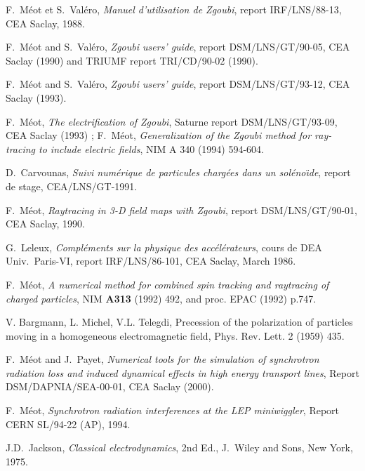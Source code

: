 \begin{thebibliography}{99}  %

 F.~M\'eot et S.~Val\'ero, \textsl{Manuel
d'utilisation de  Zgoubi}, report IRF/LNS/88-13, CEA Saclay, 1988.  

 F.~M\'eot and S.~Val\'ero, \textsl{Zgoubi users' guide}, 
report DSM/LNS/GT/90-05, CEA Saclay (1990) and TRIUMF report TRI/CD/90-02 (1990). 

 F.~M\'eot and S.~Val\'ero, \textsl{Zgoubi users' guide}, 
report DSM/LNS/GT/93-12, CEA Saclay (1993). 

 F.~M\'eot, \textsl{The electrification of Zgoubi}, 
Saturne report DSM/LNS/GT/93-09, CEA Saclay (1993) ; F.~M\'eot, \textsl{
Generalization of the Zgoubi method for ray-tracing to include electric 
fields}, NIM A 340 (1994) 594-604. 

 D.~Carvounas, \textsl{Suivi num\'erique de particules charg\'ees 
dans un sol\'eno\"\i de}, report de stage, CEA/LNS/GT-1991. 

 F.~M\'eot, \textsl{Raytracing in 3-D field maps with Zgoubi}, 
report  DSM/LNS/GT/90-01, CEA Saclay, 1990.

 G.~Leleux, \textsl{Compl\'ements sur la physique des acc\'el\'erateurs}, 
cours de DEA Univ.~Paris-VI,  report  IRF/LNS/86-101, CEA Saclay, March 1986. 

 F.~M\'eot, \textsl{A numerical method for combined spin tracking and 
raytracing of charged particles}, 
NIM \textbf{A313} (1992) 492, and proc. EPAC (1992) p.747. 

 V. Bargmann, L. Michel, V.L. Telegdi,
Precession of the polarization of particles moving in a homogeneous electromagnetic field, 
Phys. Rev. Lett. 2 (1959) 435.

 F.~M\'eot and J.~Payet, 
\textsl{Numerical tools for the simulation of synchrotron radiation  
loss and induced dynamical effects in high energy transport lines},  
Report DSM/DAPNIA/SEA-00-01, CEA Saclay (2000). 

 F.~M\'eot, \textsl{Synchrotron radiation interferences at the LEP miniwiggler}, 
Report CERN SL/94-22 (AP), 1994. 

 J.D.~Jackson, \textsl{Classical electrodynamics}, 2nd 
Ed., J.~Wiley and Sons, New York, 1975.


\end{thebibliography}
